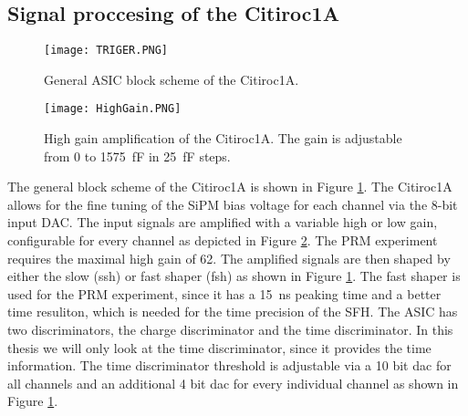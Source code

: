 \subsection{Signal proccesing of the Citiroc1A}
\begin{figure}[h]
    \centering
    \texttt{[image: TRIGER.PNG]}
    \caption{General ASIC block scheme of the Citiroc1A.\autocite{datasheetCITIROC}}
    \label{fig:CITIROC1A_TRIGEER}
\end{figure}

\begin{figure}[h]
    \centering
    \texttt{[image: HighGain.PNG]}
    \caption{High gain amplification of the Citiroc1A. The gain is adjustable from 0 to \SI{1575}{\femto\farad} in \SI{25}{\femto\farad} steps.\autocite{datasheetCITIROC}}
    \label{HighGain}
\end{figure}
The general block scheme of the Citiroc1A is shown in Figure \ref{fig:CITIROC1A_TRIGEER}.
\newline
The Citiroc1A allows for the fine tuning of the SiPM bias voltage for each channel via the 8-bit input DAC.
\newline	
The input signals are amplified with a variable high or low gain, configurable for every channel as depicted in Figure \ref{HighGain}. 
The PRM experiment requires the maximal high gain of 62.\autocite{InternalcommunicationIgor}
\newline
The amplified signals are then shaped by either the slow (ssh) or fast shaper (fsh) as shown in Figure \ref{fig:CITIROC1A_TRIGEER}. 
The fast shaper is used for the PRM experiment, since it has a \SI{15}{\nano\second} peaking time and a better time resuliton, which is needed for the time precision of the SFH.\autocite{datasheetCITIROC}
\newline
The ASIC has two discriminators, the charge discriminator and the time discriminator. In this thesis we will only look at the time discriminator,
 since it provides the time information.
The time discriminator threshold is adjustable via a 10 bit dac for all channels and an additional 4 bit dac for every individual channel as shown in Figure \ref{fig:CITIROC1A_TRIGEER}\autocite{datasheetCITIROC}.


